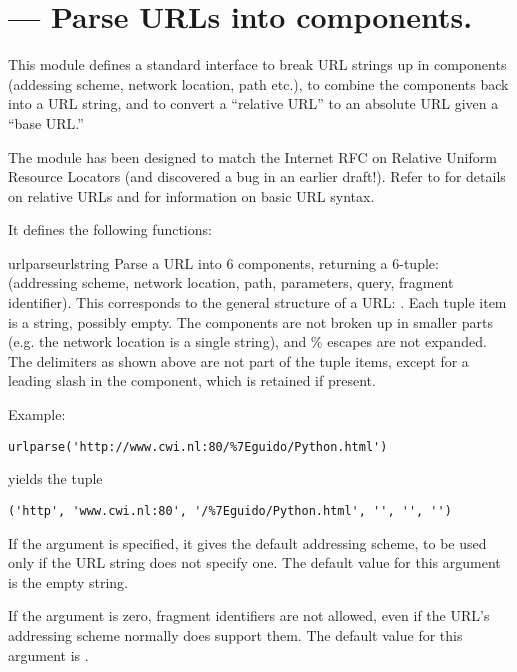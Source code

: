 \section{ ---
         Parse URLs into components.}




This module defines a standard interface to break URL strings up in
components (addessing scheme, network location, path etc.), to combine
the components back into a URL string, and to convert a ``relative
URL'' to an absolute URL given a ``base URL.''

The module has been designed to match the Internet RFC on Relative
Uniform Resource Locators (and discovered a bug in an earlier
draft!).  Refer to  for details on relative
URLs and  for information on basic URL syntax.

It defines the following functions:

\begin{funcdesc}{urlparse}{urlstring}
Parse a URL into 6 components, returning a 6-tuple: (addressing
scheme, network location, path, parameters, query, fragment
identifier).  This corresponds to the general structure of a URL:
.
Each tuple item is a string, possibly empty.
The components are not broken up in smaller parts (e.g. the network
location is a single string), and \% escapes are not expanded.
The delimiters as shown above are not part of the tuple items,
except for a leading slash in the  component, which is
retained if present.

Example:

\begin{verbatim}
urlparse('http://www.cwi.nl:80/%7Eguido/Python.html')
\end{verbatim}
%
yields the tuple

\begin{verbatim}
('http', 'www.cwi.nl:80', '/%7Eguido/Python.html', '', '', '')
\end{verbatim}
%
If the  argument is specified, it gives the
default addressing scheme, to be used only if the URL string does not
specify one.  The default value for this argument is the empty string.

If the  argument is zero, fragment identifiers
are not allowed, even if the URL's addressing scheme normally does
support them.  The default value for this argument is .
\end{funcdesc}

